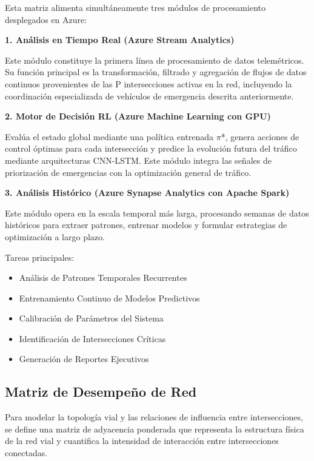 \documentclass[12pt,a4paper,oneside]{report}
\begin{document}
Esta matriz alimenta simultáneamente tres módulos de procesamiento desplegados en Azure:

\textbf{1. Análisis en Tiempo Real (Azure Stream Analytics)}

Este módulo constituye la primera línea de procesamiento de datos telemétricos. Su función principal es la transformación, filtrado y agregación de flujos de datos continuos provenientes de las P intersecciones activas en la red, incluyendo la coordinación especializada de vehículos de emergencia descrita anteriormente.

\textbf{2. Motor de Decisión RL (Azure Machine Learning con GPU)}

Evalúa el estado global mediante una política entrenada \ensuremath{\pi}*, genera acciones de control óptimas para cada intersección y predice la evolución futura del tráfico mediante arquitecturas CNN-LSTM. Este módulo integra las señales de priorización de emergencias con la optimización general de tráfico.

\textbf{3. Análisis Histórico (Azure Synapse Analytics con Apache Spark)}

Este módulo opera en la escala temporal más larga, procesando semanas de datos históricos para extraer patrones, entrenar modelos y formular estrategias de optimización a largo plazo.

Tareas principales:

\begin{itemize}
\item
  Análisis de Patrones Temporales Recurrentes
\item
  Entrenamiento Continuo de Modelos Predictivos
\item
  Calibración de Parámetros del Sistema
\item
  Identificación de Intersecciones Críticas
\item
  Generación de Reportes Ejecutivos
\end{itemize}

\subsection{Matriz de Desempeño de Red}\label{matriz-de-desempeuxf1o-de-red}

Para modelar la topología vial y las relaciones de influencia entre intersecciones, se define una matriz de adyacencia ponderada que representa la estructura física de la red vial y cuantifica la intensidad de interacción entre intersecciones conectadas.
\end{document}
